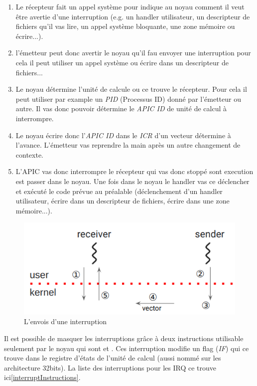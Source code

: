 \begin{enumerate}[label=\protect\circled{\arabic*}]
  \item Le récepteur fait un appel système pour indique au noyau comment il veut être avertie d'une interruption (e.g. un handler utilisateur, un descripteur de fichiers qu'il vas lire, un appel système bloquante, une zone mémoire ou écrire...).
  \item l'émetteur peut donc avertir le noyau qu'il fau envoyer une interruption pour cela il peut utiliser un appel système ou écrire dans un descripteur de fichiers...
  \item Le noyau détermine l'unité de calcule ou ce trouve le récepteur. Pour cela il peut utiliser par example un \emph{PID} (Processus ID) donné par l'émetteur ou autre.
  Il vas donc pouvoir détermine le \emph{APIC ID} de unité de calcul à interrompre.
  \item Le noyau écrire donc l'\emph{APIC ID} dans le \emph{ICR} d'un vecteur détermine à l'avance. L'émetteur vas reprendre la main après un autre changement de contexte.
  \item L'APIC vas donc interrompre le récepteur qui vas donc stoppé sont execution est passer dans le noyau.
  Une fois dans le noyau le handler vas ce déclencher et exécuté le code prévue au préalable (déclenchement d'un handler utilisateur, écrire dans un descripteur de fichiers, écrire dans une zone mémoire...).
\end{enumerate}

\begin{figure}[H]
  \includegraphics[width=\textwidth]{images/interruptSend.png}
  \caption{L'envois d'une interruption}
  \label{fig:sendInt}
\end{figure}

Il est possible de masquer les interruptions grâce à deux instructions utilisable seulement par le noyau qui sont  et .
Ces interruption modifie un flag (\emph{IF}) qui ce trouve dans le registre d'états de l'unité de calcul  (aussi nommé  sur les architecture 32bits).
La liste des interruptions pour les IRQ ce trouve ici\ref{interruptInstructions}.

